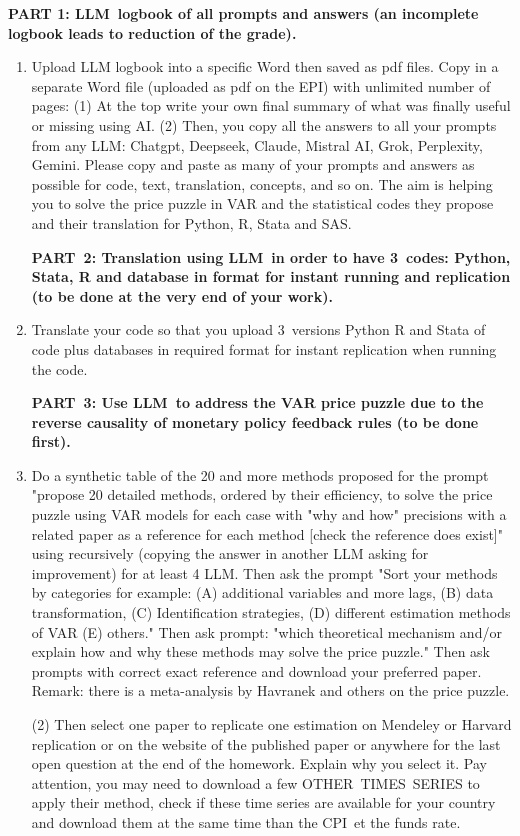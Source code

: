 \documentclass[12pt,a4paper]{article}%
\begin{document}
\bigskip\textbf{PART 1: LLM\ logbook of all prompts and answers (an incomplete
logbook leads to reduction of the grade).}

\begin{enumerate}
\item Upload LLM logbook into a specific Word then saved as pdf files. Copy in
a separate Word file (uploaded as pdf on the EPI) with unlimited number of
pages: (1) At the top write your own final summary of what was finally useful
or missing using AI. (2) Then, you copy all the answers to all your prompts
from any LLM: Chatgpt, Deepseek, Claude, Mistral AI, Grok, Perplexity, Gemini.
Please copy and paste as many of your prompts and answers as possible for
code, text, translation, concepts, and so on. The aim is helping you to solve
the price puzzle in VAR and the statistical codes they propose and their
translation for Python, R, Stata and SAS.

\textbf{PART\ 2: Translation using LLM\ in order to have 3\ codes: Python,
Stata, R and database in format for instant running and replication (to be
done at the very end of your work).}

\item Translate your code so that you upload 3\ versions Python R and Stata of
code plus databases in required format for instant replication when running
the code.

\textbf{PART\ 3: Use LLM\ to address the VAR price puzzle due to the reverse
causality of monetary policy feedback rules (to be done first).}

\item Do a synthetic table of the 20 and more methods proposed for the prompt
"propose 20 detailed methods, ordered by their efficiency, to solve the price
puzzle using VAR models for each case with "why and how" precisions with a
related paper as a reference for each method [check the reference does exist]"
using recursively (copying the answer in another LLM asking for improvement)
for at least 4 LLM. Then ask the prompt "Sort your methods by categories for
example: (A) additional variables and more lags, (B) data transformation, (C)
Identification strategies, (D) different estimation methods of VAR (E)
others." Then ask prompt: "which theoretical mechanism and/or explain how and
why these methods may solve the price puzzle." Then ask prompts with correct
exact reference and download your preferred paper. Remark: there is a
meta-analysis by Havranek and others on the price puzzle.

(2) Then select one paper to replicate one estimation on Mendeley or Harvard
replication or on the website of the published paper or anywhere for the last
open question at the end of the homework. Explain why you select it. Pay
attention, you may need to download a few OTHER\ TIMES\ SERIES to apply their
method, check if these time series are available for your country and download
them at the same time than the CPI\ et the funds rate.


\end{enumerate}
\end{document}

